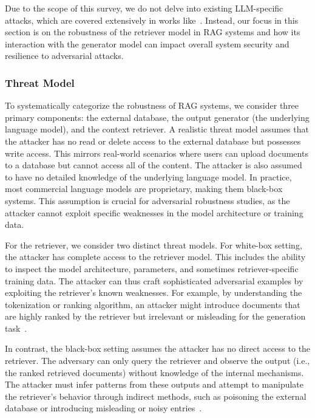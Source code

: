 
Due to the scope of this survey, we do not delve into existing LLM-specific attacks, which are covered extensively in works like~\cite{trustworthy_llms_2024, huang2023surveysafetytrustworthinesslarge}. Instead, our focus in this section is on the robustness of the retriever model in RAG systems and how its interaction with the generator model can impact overall system security and resilience to adversarial attacks.

\subsubsection{Threat Model} To systematically categorize the robustness of RAG systems, we consider three primary components: the external database, the output generator (the underlying language model), and the context retriever. A realistic threat model assumes that the attacker has no read or delete access to the external database but possesses write access. This mirrors real-world scenarios where users can upload documents to a database but cannot access all of the content. The attacker is also assumed to have no detailed knowledge of the underlying language model. In practice, most commercial language models are proprietary, making them black-box systems. This assumption is crucial for adversarial robustness studies, as the attacker cannot exploit specific weaknesses in the model architecture or training data. 

For the retriever, we consider two distinct threat models. For white-box setting, the attacker has complete access to the retriever model. This includes the ability to inspect the model architecture, parameters, and sometimes retriever-specific training data. The attacker can thus craft sophisticated adversarial examples by exploiting the retriever’s known weaknesses. For example, by understanding the tokenization or ranking algorithm, an attacker might introduce documents that are highly ranked by the retriever but irrelevant or misleading for the generation task~\cite{zou2024poisonedragknowledgecorruptionattacks}.

In contrast, the black-box setting assumes the attacker has no direct access to the retriever. The adversary can only query the retriever and observe the output (i.e., the ranked retrieved documents) without knowledge of the internal mechanisms. The attacker must infer patterns from these outputs and attempt to manipulate the retriever's behavior through indirect methods, such as poisoning the external database or introducing misleading or noisy entries~\cite{deng2024pandorajailbreakgptsretrieval}.

